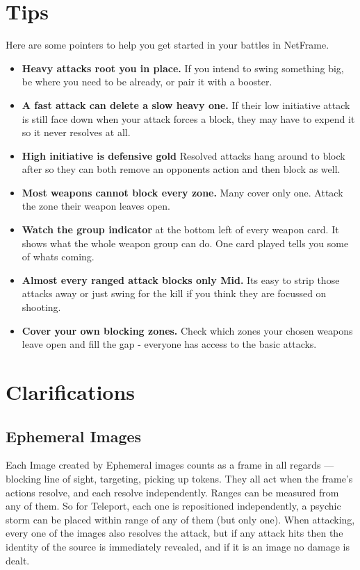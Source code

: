 \documentclass[a4paper, twocolumn]{article}
\begin{document}
\section{Tips}
Here are some pointers to help you get started in your battles in NetFrame.
\begin{itemize}
\item \textbf{Heavy attacks root you in place.} If you intend to swing something big, be
where you need to be already, or pair it with a booster.
\item \textbf{A fast attack can delete a slow heavy one.} If their low initiative
attack is still face down when your attack forces a block, they may have to
expend it so it never resolves at all.
\item \textbf{High initiative is defensive gold} Resolved attacks hang around to block after
so they can both remove an opponents action and then block as well.
\item \textbf{Most weapons cannot block every zone.} Many cover only one. Attack the zone
their weapon leaves open.
\item \textbf{Watch the group indicator} at the bottom left of every weapon card. It shows
what the whole weapon group can do. One card played tells you some of whats coming.
\item \textbf{Almost every ranged attack blocks only Mid.} Its easy to strip those attacks away
or just swing for the kill if you think they are focussed on shooting.
\item \textbf{Cover your own blocking zones.} Check which zones your chosen weapons leave
open and fill the gap - everyone has access to the basic attacks.
\end{itemize}


\section{Clarifications}

\subsection{Ephemeral Images}
Each Image created by Ephemeral images counts as a frame in all regards --- blocking line of
sight, targeting, picking up tokens. They all act when the frame's actions resolve, and each
resolve independently. Ranges can be measured from any of them. So for Teleport, each one 
is repositioned independently, a psychic storm can be placed within range of any of them
 (but only one). When attacking, every one of the images also resolves the attack, but if 
any attack hits then the identity of the source is immediately revealed, and if it is an image
no damage is dealt.
\end{document}
